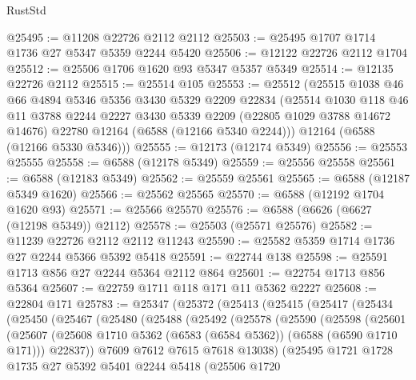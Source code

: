 \begin{lexlean}{RustStd}
\begin{coremodule}
@25495 := @11208 @22726 @2112 @2112
@25503 := @25495 @1707 @1714 @1736 @27 @5347 @5359 @2244 @5420
@25506 := @12122 @22726 @2112 @1704
@25512 := @25506 @1706 @1620 @93 @5347 @5357 @5349
@25514 := @12135 @22726 @2112
@25515 := @25514 @105
@25553 := @25512
    (@25515
      @1038
      @46
      @66
      @4894
      @5346
      @5356
      @3430
      @5329
      @2209
      @22834
      (@25514
        @1030
        @118
        @46
        @11
        @3788
        @2244
        @2227
        @3430
        @5339
        @2209
        (@22805 @1029 @3788 @14672 @14676)
        @22780
        @12164
        (@6588 (@12166 @5340 @2244)))
      @12164
      (@6588 (@12166 @5330 @5346)))
@25555 := @12173 (@12174 @5349)
@25556 := @25553 @25555
@25558 := @6588 (@12178 @5349)
@25559 := @25556 @25558
@25561 := @6588 (@12183 @5349)
@25562 := @25559 @25561
@25565 := @6588 (@12187 @5349 @1620)
@25566 := @25562 @25565
@25570 := @6588 (@12192 @1704 @1620 @93)
@25571 := @25566 @25570
@25576 := @6588 (@6626 (@6627 (@12198 @5349)) @2112)
@25578 := @25503 (@25571 @25576)
@25582 := @11239 @22726 @2112 @2112 @11243
@25590 := @25582 @5359 @1714 @1736 @27 @2244 @5366 @5392 @5418
@25591 := @22744 @138
@25598 := @25591 @1713 @856 @27 @2244 @5364 @2112 @864
@25601 := @22754 @1713 @856 @5364
@25607 := @22759 @1711 @118 @171 @11 @5362 @2227
@25608 := @22804 @171
@25783 := @25347
    (@25372
      (@25413
        (@25415
          (@25417
            (@25434
              (@25450
                (@25467
                  (@25480
                    (@25488
                      (@25492
                        (@25578
                          (@25590
                            (@25598
                              (@25601
                                (@25607
                                  (@25608
                                    @1710
                                    @5362
                                    (@6583 (@6584 @5362))
                                    (@6588 (@6590 @1710 @171)))
                                  @22837))
                              @7609
                              @7612
                              @7615
                              @7618
                              @13038)
                            (@25495
                              @1721
                              @1728
                              @1735
                              @27
                              @5392
                              @5401
                              @2244
                              @5418
                              (@25506
                                @1720

\end{coremodule}
\end{lexlean}
